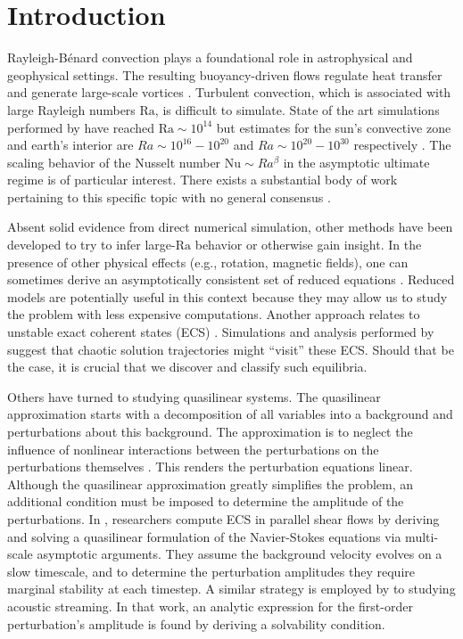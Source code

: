 \documentclass[reprint,amsmath,amssymb,aps]{revtex4-1}
\newcommand\Ra{\mathrm{Ra}}
\newcommand\Nu{\mathrm{Nu}}
\begin{document}
\section{Introduction}
Rayleigh-B\'enard convection plays a foundational role in astrophysical and geophysical settings.
The resulting buoyancy-driven flows regulate heat transfer and generate large-scale vortices \cite{Couston}.
Turbulent convection, which is associated with large Rayleigh numbers $\Ra$, is difficult to simulate. 
State of the art simulations performed by \cite{Zhu_2018} have reached $\Ra \sim 10^{14}$ but estimates for the sun's convective zone and earth's interior are $Ra \sim 10^{16}-10^{20}$ and $Ra \sim 10^{20}-10^{30}$ respectively \cite{Ossendrijver,Gubbins_2001}. 
The scaling behavior of the Nusselt number $\Nu \sim Ra^{\beta}$ in the asymptotic ultimate regime is of particular interest.
There exists a substantial body of work pertaining to this specific topic with no general consensus \cite{Malkus_1954, Howard_1966, Kraichnan, Spiegel, Castaing, Grossman, Ahlers}. 

Absent solid evidence from direct numerical simulation, other methods have been developed to try to infer large-$\Ra$ behavior or otherwise gain insight.
In the presence of other physical effects (e.g., rotation, magnetic fields), one can sometimes derive an asymptotically consistent set of reduced equations \cite{Julien2007, Julien2012}.
Reduced models are potentially useful in this context because they may allow us to study the problem with less expensive computations.
Another approach relates to unstable exact coherent states (ECS) \cite{Waleffe, Sondak, Wen, chini_cells}. 
Simulations and analysis performed by \cite{Yalniz, Cvitanovic} suggest that chaotic solution trajectories might ``visit'' these ECS.
Should that be the case, it is crucial that we discover and classify such equilibria. 

Others have turned to studying quasilinear systems.
The quasilinear approximation starts with a decomposition of all variables into a background and perturbations about this background.
The approximation is to neglect the influence of nonlinear interactions between the perturbations on the perturbations themselves \cite{marston2016}.
This renders the perturbation equations linear.
Although the quasilinear approximation greatly simplifies the problem, an additional condition must be imposed to determine the amplitude of the perturbations.
In \cite{Beaume_2015}, researchers compute ECS in parallel shear flows by deriving and solving a quasilinear formulation of the Navier-Stokes equations via multi-scale asymptotic arguments. 
They assume the background velocity evolves on a slow timescale, and to determine the perturbation amplitudes they require marginal stability at each timestep.
A similar strategy is employed by \cite{michel_chini_2019} to studying acoustic streaming.
In that work, an analytic expression for the first-order perturbation's amplitude is found by deriving a solvability condition.
\end{document}
